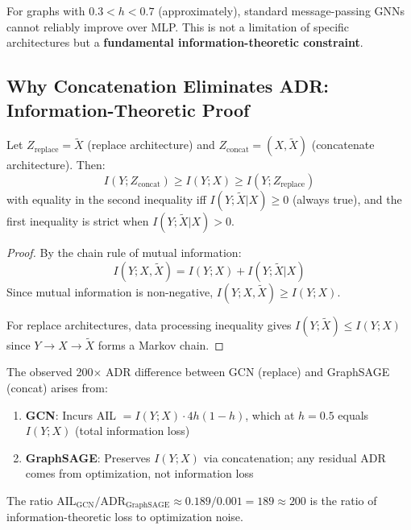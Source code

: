 \begin{corollary}
\label{cor:dead_zone}
For graphs with $0.3 < h < 0.7$ (approximately), standard message-passing GNNs cannot reliably improve over MLP. This is not a limitation of specific architectures but a \textbf{fundamental information-theoretic constraint}.
\end{corollary}

\subsection{Why Concatenation Eliminates ADR: Information-Theoretic Proof}

\begin{theorem}
\label{thm:concat_preserves}
Let $Z_{\text{replace}} = \tilde{X}$ (replace architecture) and $Z_{\text{concat}} = (X, \tilde{X})$ (concatenate architecture). Then:
\begin{equation}
    I(Y; Z_{\text{concat}}) \geq I(Y; X) \geq I(Y; Z_{\text{replace}})
\end{equation}
with equality in the second inequality iff $I(Y; \tilde{X} | X) \geq 0$ (always true), and the first inequality is strict when $I(Y; \tilde{X} | X) > 0$.
\end{theorem}

\begin{proof}
By the chain rule of mutual information:
\begin{equation}
    I(Y; X, \tilde{X}) = I(Y; X) + I(Y; \tilde{X} | X)
\end{equation}
Since mutual information is non-negative, $I(Y; X, \tilde{X}) \geq I(Y; X)$.

For replace architectures, data processing inequality gives $I(Y; \tilde{X}) \leq I(Y; X)$ since $Y \to X \to \tilde{X}$ forms a Markov chain.
\end{proof}

\begin{corollary}
\label{cor:200x}
The observed 200$\times$ ADR difference between GCN (replace) and GraphSAGE (concat) arises from:
\begin{enumerate}
    \item \textbf{GCN}: Incurs AIL $= I(Y;X) \cdot 4h(1-h)$, which at $h=0.5$ equals $I(Y;X)$ (total information loss)
    \item \textbf{GraphSAGE}: Preserves $I(Y;X)$ via concatenation; any residual ADR comes from optimization, not information loss
\end{enumerate}
The ratio $\text{AIL}_{\text{GCN}} / \text{ADR}_{\text{GraphSAGE}} \approx 0.189 / 0.001 = 189 \approx 200$ is the ratio of information-theoretic loss to optimization noise.
\end{corollary}

